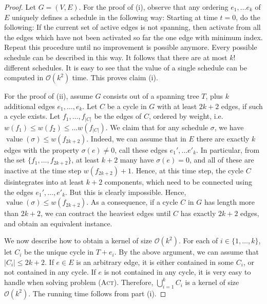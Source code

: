 \documentclass[runningheads]{llncs}
\numberwithin{equation}{section}
\newcommand{\set}[1]{\{ #1 \}}
\newcommand{\fromto}[2]{\set{#1, \ldots, #2}}
\newcommand{\bigO}{\mathcal{O}}
\newcommand{\act}{\textsc{(Act)}}
\DeclareMathOperator{\val}{\text{value}}
\begin{document}
\begin{proof}
Let $G = (V, E)$. For the proof of (i), observe that any ordering $e_1, \dots e_k$ of $E$ uniquely defines a schedule in the following way: Starting at time $t = 0$, do the following: If the current set of active edges is not spanning, then activate from all the edges which have not been activated so far the one edge with minimum index. Repeat this procedure until no improvement is possible anymore. Every possible schedule can be described in this way. It follows that there are at most $k!$ different schedules. It is easy to see that the value of a single schedule can be computed in $\bigO(k^2)$ time. This proves claim (i).

For the proof of (ii), assume $G$ consists out of a spanning tree $T$, plus $k$ additional edges $e_1, \dots, e_k$. Let $C$ be a cycle in $G$ with at least $2k+2$ edges, if such a cycle exists. Let $f_1, \dots, f_{|C|}$ be the edges of $C$, ordered by weight, i.e.\ $w(f_1) \leq w(f_2) \leq \dots w(f_{|C|})$. We claim that for any schedule $\sigma$, we have $\val(\sigma) \leq w(f_{2k+2})$. Indeed, we can assume that in $E$ there are exactly $k$ edges with the property $\sigma(e) \neq 0$, call these edges $e_1', \dots e'_k$. In particular, from the set $\fromto{f_1}{f_{2k+2}}$, at least $k+2$ many have $\sigma(e) = 0$, and all of these are inactive at the time step $w(f_{2k+2}) + 1$. Hence, at this time step, the cycle $C$ disintegrates into at least $k+2$ components, which need to be connected using the edges $e_1', \dots, e'_k$. But this is clearly impossible. Hence, $\val(\sigma) \leq w(f_{2k+2})$. As a consequence, if a cycle $C$ in $G$ has length more than $2k+2$, we can contract the heaviest edges until $C$ has exactly $2k+2$ edges, and obtain an equivalent instance.

We now describe how to obtain a kernel of size $\bigO(k^2)$. For each of $i \in \fromto{1}{k}$, let $C_i$ be the unique cycle in $T + e_i$. By the above argument, we can assume that $|C_i| \leq 2k+2$. If $e \in E$ is an arbitrary edge, it is either contained in some $C_i$, or not contained in any cycle. If $e$ is not contained in any cycle, it is very easy to handle when solving problem {\act}. Therefore, $\bigcup_{i=1}^k C_i$ is a kernel of size $\bigO(k^2)$. The running time follows from part (i).


\end{proof}
\end{document}
